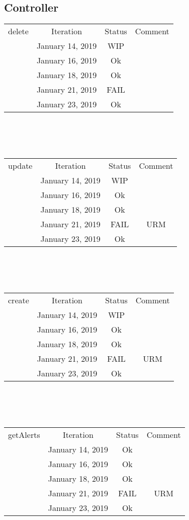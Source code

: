 \documentclass{scrreprt}
\begin{document}
\subsection{Controller}
	\begin{tabularx}{12cm}{X|c|c|c}
		delete & Iteration & Status & Comment \\
		& January 14, 2019 & WIP & \\
		& January 16, 2019 & Ok & \\
		& January 18, 2019 & Ok & \\
		& January 21, 2019 & FAIL & \\
		& January 23, 2019 & Ok & \\
	
	\end{tabularx}
	\\ \\ \\	
	\begin{tabularx}{12cm}{X|c|c|c}
		update & Iteration & Status & Comment \\
		& January 14, 2019 & WIP & \\
		& January 16, 2019 & Ok & \\
		& January 18, 2019 & Ok & \\
		& January 21, 2019 & FAIL & URM\\
		& January 23, 2019 & Ok & \\
	 
	\end{tabularx}
	\\ \\ \\	
	\begin{tabularx}{12cm}{X|c|c|c}
		create & Iteration & Status & Comment  \\
		& January 14, 2019 & WIP & \\
		& January 16, 2019 & Ok & \\
		& January 18, 2019 & Ok & \\
		& January 21, 2019 & FAIL & URM\\
		& January 23, 2019 & Ok & \\

	\end{tabularx}
	\\ \\ \\
	\begin{tabularx}{12cm}{X|c|c|c}
		getAlerts & Iteration & Status & Comment \\
		& January 14, 2019 & Ok & \\
		& January 16, 2019 & Ok & \\
		& January 18, 2019 & Ok & \\
		& January 21, 2019 & FAIL & URM \\
		& January 23, 2019 & Ok & \\
	\end{tabularx}
\end{document}
